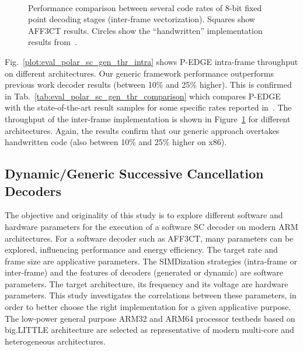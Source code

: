 \begin{figure}[htp]
  \centering
  \\
  \caption{Performance comparison between several code rates of 8-bit fixed
    point decoding stages (inter-frame vectorization). Squares show AFF3CT
    results. Circles show the ``handwritten'' implementation results
    from~\cite{LeGal2015a}.}
  \label{plot:eval_polar_sc_gen_thr_inter}
\end{figure}

Fig.~\ref{plot:eval_polar_sc_gen_thr_intra} shows P-EDGE intra-frame throughput
on different architectures. Our generic framework performance outperforms
previous work decoder results (between 10\% and 25\% higher). This is confirmed
in Tab.~\ref{tab:eval_polar_sc_gen_thr_comparison} which compares P-EDGE with
the state-of-the-art result samples for some specific rates reported
in~\cite{Sarkis2014}. The throughput of the inter-frame implementation is shown
in Figure~\ref{plot:eval_polar_sc_gen_thr_inter} for different architectures.
Again, the results confirm that our generic approach overtakes handwritten code
(also between 10\% and 25\% higher on x86).

\subsection{Dynamic/Generic Successive Cancellation Decoders}

The objective and originality of this study is to explore different software and
hardware parameters for the execution of a software SC decoder on modern ARM
architectures. For a software decoder such as AFF3CT, many parameters can be
explored, influencing performance and energy efficiency. The target rate and
frame size are applicative parameters. The SIMDization strategies (intra-frame
or inter-frame) and the features of decoders (generated or dynamic) are software
parameters. The target architecture, its frequency and its voltage are hardware
parameters. This study investigates the correlations between these parameters,
in order to better choose the right implementation for a given applicative
purpose. The low-power general purpose ARM32 and ARM64 processor testbeds based
on big.LITTLE architecture are selected as representative of modern multi-core
and heterogeneous architectures.

